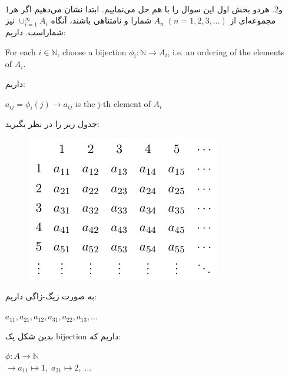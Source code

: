 \\[0.1in]
\begin{enumerate}
    \item[1و2.] هردو بخش اول این سوال را با هم حل می‌نماییم.
    ابتدا نشان می‌دهیم اگر هر مجموعه‌ای از 
    $A_n\;(n=1,2,3,\ldots)$
    شمارا و نامتناهی باشند، آنگاه 
    $\cup_{i=1}^\infty A_i$
    نیز شماراست. داریم:\\[0.15in]
    \begin{center}
        \begin{latin}
            For each $i\in \mathbb{N}$, choose a bijection $\phi_i:
            \mathbb{N} \longrightarrow A_i$, i.e. an ordering of the elements
            of $A_i$.
        \end{latin}
    \end{center}
    داریم:\newline
    \begin{center}
        \begin{latin}
            $a_{ij} = \phi_i(j) \xrightarrow{} a_{ij}$ is the j-th element of $A_i$
        \end{latin}
    \end{center}
    جدول زیر را در نظر بگیرید:\newline
    \begin{figure} [H]
        \centering
        \includegraphics[scale=1]{solution/tab.png}
    \end{figure}
    به صورت زیگ-زاگی داریم:\newline
    \begin{center}
        $a_{11},a_{21},a_{12},a_{31},a_{22},a_{13}, \ldots$
    \end{center}
    بدین شکل یک bijection داریم که:\\[0.1in]
    \begin{center}
        $\phi : A \xrightarrow{} \mathbb{N}$\\[0.07in]
        $\longrightarrow a_{11} \mapsto 1,\; a_{21} \mapsto 2, \; \ldots$

\end{center}
\end{enumerate}
